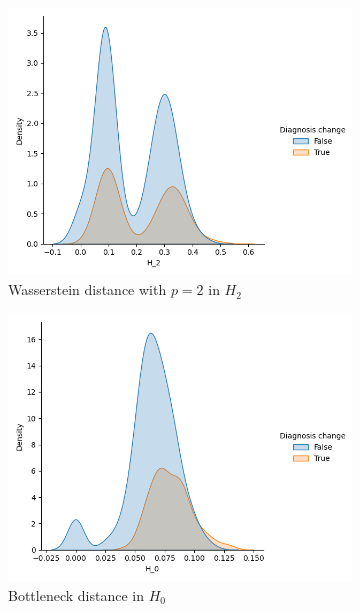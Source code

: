 \documentclass{article}
\begin{document}
\begin{figure}
\begin{subfigure}{0.32\textwidth}
    \includegraphics[width=\textwidth]{figures/temporal_evolution/wasserstein_H_2_dist_diag_change.png}
    \caption{Wasserstein distance with $p=2$ in $H_2$}
  \end{subfigure}
  \begin{subfigure}{0.32\textwidth}
    \includegraphics[width=\textwidth]{figures/temporal_evolution/bottleneck_H_0_dist_diag_change.png}
    \caption{Bottleneck distance in $H_0$}
  \end{subfigure}
  \begin{subfigure}{0.32\textwidth}

\end{subfigure}
\end{figure}
\end{document}
